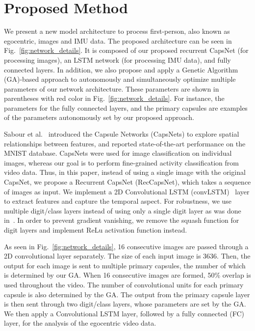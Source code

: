 \documentclass[10pt,twocolumn,letterpaper]{article}
\begin{document}
\vspace{-0.4cm}
\section{Proposed Method} \label{sec:proposedMethod} \vspace{-0.15cm}
We present a new model architecture to process first-person, also known as egocentric, images and IMU data. The proposed architecture can be seen in Fig.~\ref{fig:network_details}. It is composed of our proposed recurrent CapsNet (for processing images), an LSTM network (for processing IMU data), and fully connected layers. In addition, we also propose and apply a Genetic Algorithm (GA)-based approach to autonomously and simultaneously optimize multiple parameters of our network architecture. These parameters are shown in parentheses with red color in Fig.~\ref{fig:network_details}. For instance, the parameters for the fully connected layers, and the primary capsules are examples of the parameters autonomously set by our proposed approach.


Sabour et al.~\cite{Sabour2017_CapsNet} introduced the Capsule Networks (CapsNets) to explore spatial relationships between features, and reported state-of-the-art performance on the MNIST database. CapsNets \cite{Sabour2017_CapsNet} were used for image classification on individual images, whereas our goal is to perform fine-grained activity classification from video data. Thus, in this paper, instead of using a single image with the original CapsNet, we propose a Recurrent CapsNet (RecCapsNet), which takes a sequence of images as input. We implement a 2D Convolutional LSTM (convLSTM)~\cite{Shi2017_convlstm} layer to extract features and capture the temporal aspect. For robustness, we use multiple digit/class layers instead of using only a single digit layer as was done in~\cite{Sabour2017_CapsNet}. In order to prevent gradient vanishing, we remove the squash function for digit layers and implement ReLu activation function instead.

As seen in Fig.~\ref{fig:network_details}, 16 consecutive images are passed through a 2D convolutional layer separately. The size of each input image is 3636. Then, the output for each image is sent to multiple primary capsules, the number of which is determined by our GA. When 16 consecutive images are formed, 50\% overlap is used throughout the video. The number of convolutional units for each primary capsule is also determined by the GA. The output from the primary capsule layer is then sent through two digit/class layers, whose parameters are set by the GA. We then apply a Convolutional LSTM layer, followed by a fully connected (FC) layer, for the analysis of the egocentric video data.
\end{document}
